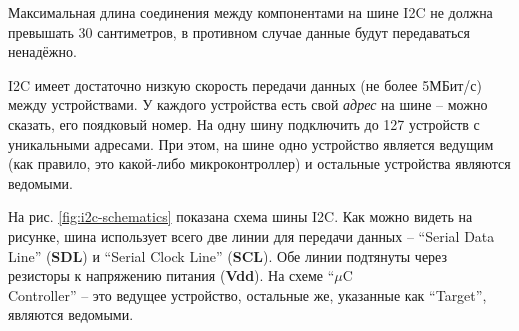 \documentclass[../sparc.tex]{subfiles}
\begin{document}
Максимальная длина соединения между компонентами на шине \gls{I2C} не должна
превышать 30 сантиметров, в противном случае данные будут передаваться
ненадёжно.

\gls{I2C} имеет достаточно низкую скорость передачи данных (не более 5МБит/с)
между устройствами.  У каждого устройства есть свой \textit{адрес} на шине --
можно сказать, его поядковый номер.  На одну шину подключить до 127 устройств с
уникальными адресами.  При этом, на шине одно устройство является ведущим (как
правило, это какой-либо микроконтроллер) и остальные устройства являются
ведомыми.

На рис. \ref{fig:i2c-schematics} показана схема шины \gls{I2C}. Как можно видеть
на рисунке, шина использует всего две линии для передачи данных -- ``Serial Data
Line'' (\textbf{SDL}) и ``Serial Clock Line'' (\textbf{SCL}). Обе линии
подтянуты через резисторы к напряжению питания (\textbf{Vdd}).  На схеме
``$\mu$C\\Controller'' -- это ведущее устройство, остальные же, указанные как
``Target'', являются ведомыми.
\end{document}
